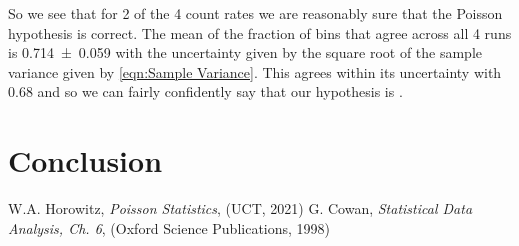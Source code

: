\documentclass[12pt]{article}
\numberwithin{equation}{section}
\numberwithin{figure}{section}
\numberwithin{table}{section}
\begin{document}
\par So we see that for 2 of the 4 count rates we are reasonably sure that the Poisson hypothesis is correct. The mean of the fraction of bins that agree across all 4 runs is \num{0.714\pm0.059} with the uncertainty given by the square root of the sample variance given by \autoref{eqn:Sample Variance}. This agrees within its uncertainty with 0.68 and so we can fairly confidently say that our hypothesis is . 

\section{Conclusion}\label{sec:Conclusion}



\newpage
\appendix




\begin{thebibliography}{9}
    W.A. Horowitz, \textit{Poisson Statistics}, (UCT, 2021)
    G. Cowan, \textit{Statistical Data Analysis, Ch. 6}, (Oxford Science Publications, 1998)

\end{thebibliography}
\end{document}
